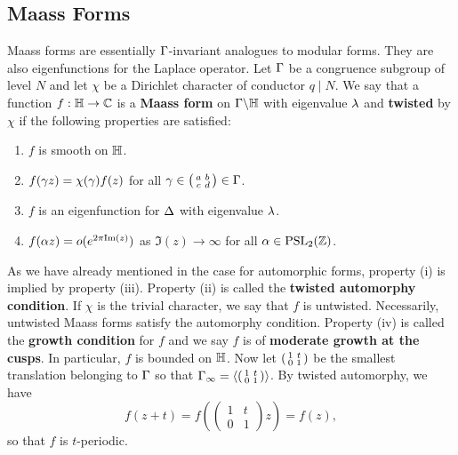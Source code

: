    \subsection*{Maass Forms}
      Maass forms are essentially $\Gamma$-invariant analogues to modular forms. They are also eigenfunctions for the Laplace operator. Let $\Gamma$ be a congruence subgroup of level $N$ and let $\chi$ be a Dirichlet character of conductor $q \mid N$. We say that a function $f:\mathbb{H} \to \mathbb{C}$ is a \textbf{Maass form} on $\Gamma\backslash\mathbb{H}$ with eigenvalue $\lambda$ and \textbf{twisted} by $\chi$ if the following properties are satisfied:
      \begin{enumerate}[label=(\roman*)]
        \item $f$ is smooth on $\mathbb{H}$.
        \item $f(\gamma z) = \chi(\gamma)f(z)$ for all $\gamma \in \begin{psmallmatrix} a & b \\ c & d \end{psmallmatrix} \in \Gamma$.
        \item $f$ is an eigenfunction for $\Delta$ with eigenvalue $\lambda$.
        \item $f(\alpha z) = o(e^{2\pi\mathrm{Im}(z)})$ as $\Im(z) \to \infty$ for all $\alpha \in \mathrm{PSL}_{2}(\mathbb{Z})$.
      \end{enumerate}
      As we have already mentioned in the case for automorphic forms, property (i) is implied by property (iii). Property (ii) is called the \textbf{twisted automorphy condition}. If $\chi$ is the trivial character, we say that $f$ is untwisted. Necessarily, untwisted Maass forms satisfy the automorphy condition. Property (iv) is called the \textbf{growth condition} for $f$ and we say $f$ is of \textbf{moderate growth at the cusps}. In particular, $f$ is bounded on $\mathbb{H}$. Now let $\begin{psmallmatrix} 1 & t \\ 0 & 1 \end{psmallmatrix}$ be the smallest translation belonging to $\Gamma$ so that $\Gamma_{\infty} = \left\langle\begin{psmallmatrix} 1 & t \\ 0 & 1 \end{psmallmatrix}\right\rangle$. By twisted automorphy, we have
      \[
        f(z+t) = f\left(\begin{pmatrix} 1 & t \\ 0 & 1 \end{pmatrix}z\right) = f(z),
      \]
      so that $f$ is $t$-periodic.

